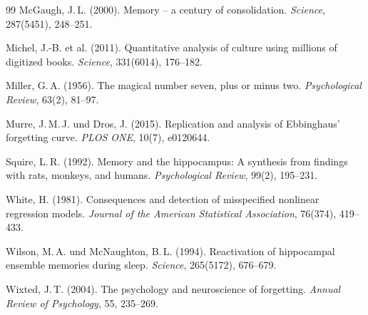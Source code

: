 ﻿\documentclass[12pt,a4paper,twoside]{article}
\theoremstyle{theormstyle}
\theoremstyle{proofstyle}
\begin{document}
\begin{thebibliography}{99}
		McGaugh, J.\,L. (2000).
		Memory -- a century of consolidation.
		\textit{Science}, 287(5451), 248--251.
		
		Michel, J.-B. et al. (2011).
		Quantitative analysis of culture using millions of digitized books.
		\textit{Science}, 331(6014), 176--182.
		
		Miller, G.\,A. (1956).
		The magical number seven, plus or minus two.
		\textit{Psychological Review}, 63(2), 81--97.
		
		Murre, J.\,M.\,J. und Dros, J. (2015).
		Replication and analysis of Ebbinghaus' forgetting curve.
		\textit{PLOS ONE}, 10(7), e0120644.
		
		Squire, L.\,R. (1992).
		Memory and the hippocampus: A synthesis from findings
		with rats, monkeys, and humans.
		\textit{Psychological Review}, 99(2), 195--231.
		
		White, H. (1981).
		Consequences and detection of misspecified nonlinear
		regression models.
		\textit{Journal of the American Statistical Association}, 76(374), 419--433.
		
		Wilson, M.\,A. und McNaughton, B.\,L. (1994).
		Reactivation of hippocampal ensemble memories during sleep.
		\textit{Science}, 265(5172), 676--679.
		
		Wixted, J.\,T. (2004).
		The psychology and neuroscience of forgetting.
		\textit{Annual Review of Psychology}, 55, 235--269.
		
	\end{thebibliography}
	
\end{document}
